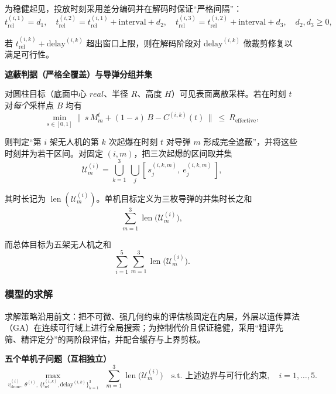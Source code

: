 \documentclass[withoutpreface,bwprint]{cumcmthesis} %
\begin{document}
为稳健起见，投放时刻采用差分编码并在解码时保证“严格间隔”：
\begin{equation}
	t_{\text{rel}}^{(i,1)}=d_1,\quad
	t_{\text{rel}}^{(i,2)}=t_{\text{rel}}^{(i,1)}+\text{interval}+d_2,\quad
	t_{\text{rel}}^{(i,3)}=t_{\text{rel}}^{(i,2)}+\text{interval}+d_3,\quad d_2,d_3\ge 0,
\end{equation}

若 $t_{\text{rel}}^{(i,k)}+\text{delay}^{(i,k)}$ 超出窗口上限，则在解码阶段对 $\text{delay}^{(i,k)}$ 做裁剪修复以满足可行性。

\textbf{遮蔽判据（严格全覆盖）与导弹分组并集}

对圆柱目标（底面中心 $real$、半径 $R$、高度 $H$）可见表面离散采样。若在时刻 $t$ 对\emph{每个}采样点 $B$ 均有
\begin{equation}
	\min_{s\in[0,1]}
	\Big\|\, s\,M_m^{t}+(1-s)\,B - C^{(i,k)}(t)\,\Big\|
	\ \le\ R_{\text{effective}},
\end{equation}

则判定“第 $i$ 架无人机的第 $k$ 次起爆在时刻 $t$ 对导弹 $m$ 形成完全遮蔽”，并将这些时刻并为若干区间。对固定 $(i,m)$，把三次起爆的区间取并集
\begin{equation}
	\mathcal{U}^{(i)}_{m}=\bigcup_{k=1}^{3}\ \bigcup_j [\,s_{j}^{(i,k,m)},\ e_{j}^{(i,k,m)}\,],
\end{equation}

其时长记为 $\operatorname{len}(\mathcal{U}^{(i)}_{m})$。单机目标定义为三枚导弹的并集时长之和
\begin{equation}
	\sum_{m=1}^{3}\operatorname{len}\!\big(\mathcal{U}^{(i)}_{m}\big),
\end{equation}

而总体目标为五架无人机之和
\begin{equation}
	\sum_{i=1}^{5}\sum_{m=1}^{3}\operatorname{len}\!\big(\mathcal{U}^{(i)}_{m}\big).
\end{equation}

\subsubsection{模型的求解}
求解策略沿用前文：把不可微、强几何约束的评估核固定在内层，外层以遗传算法（GA）在连续可行域上进行全局搜索；为控制代价且保证稳健，采用“粗评先筛、精评定分”的两阶段评估，并配合缓存与上界剪枝。

\textbf{五个单机子问题（互相独立）}
\begin{equation}
	\max_{\,v_{\text{drone}}^{(i)},\,\theta^{(i)},\,\{t_{\text{rel}}^{(i,k)},\text{delay}^{(i,k)}\}_{k=1}^{3}}
	\ \ \sum_{m=1}^{3}\operatorname{len}\!\big(\mathcal{U}^{(i)}_{m}\big)
	\quad \text{s.t. 上述边界与可行化约束},\quad i=1,\dots,5.
\end{equation}
\end{document}
